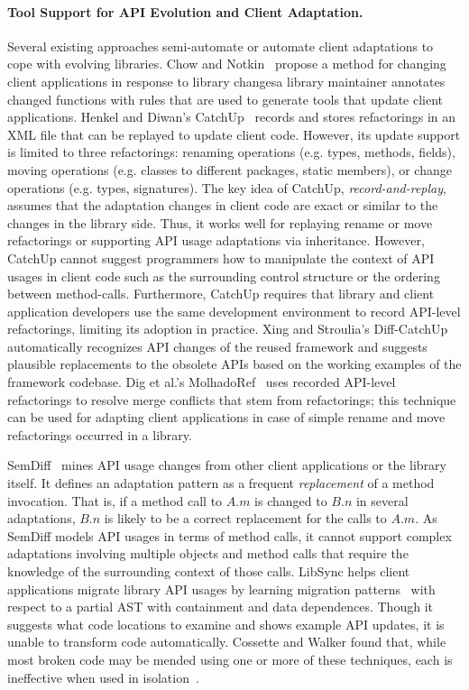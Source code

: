 \paragraph{{Tool Support for API Evolution and Client Adaptation.}} 
Several existing approaches semi-automate or automate client adaptations to cope with evolving libraries.  Chow and Notkin~\cite{Chow1996} propose a method for changing client applications in response to library changes\textemdash a library maintainer annotates changed functions with rules that are used to generate tools that update client applications. Henkel and Diwan's CatchUp~\cite{Henkel2005} records and stores refactorings in an XML file that can be replayed to update client code. However, its update support is limited to three refactorings: renaming operations (e.g.  types, methods, fields), moving operations (e.g. classes to different packages, static members), or change operations (e.g. types, signatures). The key idea of CatchUp, {\em record-and-replay}, assumes that the adaptation changes in client code are exact or similar to the changes in the library side. Thus, it works well for replaying rename or move refactorings or supporting API usage adaptations via inheritance. However, CatchUp cannot suggest programmers how to manipulate the context of API usages in client code such as the surrounding control structure or the ordering between method-calls. Furthermore, CatchUp requires that library and client application developers use the same development environment to record API-level refactorings, limiting its adoption in practice. Xing and Stroulia's Diff-CatchUp~\cite{Xing2007:diffcatchup} automatically recognizes API changes of the reused framework and suggests plausible replacements to the obsolete APIs based on the working examples of the framework codebase. Dig et al.'s MolhadoRef~\cite{Dig2007} uses recorded API-level refactorings to resolve merge conflicts that stem from refactorings; this technique can be used for adapting client applications in case of simple rename and move refactorings occurred in a library.  

SemDiff~\cite{Dagenais2008:RAC} mines API usage changes from other client applications or the library itself.  It defines an adaptation pattern as a frequent {\em replacement} of a method invocation. That is, if a method call to $A.m$ is changed to $B.n$ in several adaptations, $B.n$ is likely to be a correct replacement for the calls to $A.m$. As SemDiff models API usages in terms of method calls, it cannot support complex adaptations involving multiple objects and method calls that require the knowledge of the surrounding context of those calls. LibSync helps client applications migrate library API usages by learning migration patterns~\cite{Nguyen2010:GAA} with respect to a partial AST with containment and data dependences. Though it suggests what code locations to examine and shows example API updates, it is {unable} to transform code automatically. Cossette and Walker found that, while most broken code may be mended using one or more of these techniques, each is ineffective when used in isolation~\cite{cossette2012}.  

